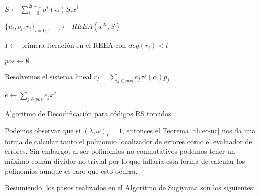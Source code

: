\begin{algorithm}
    \SetAlgoNoLine


    \BlankLine
    
    $S \gets \sum_{i=0}^{2t-1} \sigma^i(\alpha)S_ix^i$
    
    $\{ u_i,v_i,r_i \}_{i=0,1,\cdots,l} \gets REEA(x^{2t},S)$
    
    $ I \gets$ primera iteración en el REEA con $deg(r_i) < t$

    $ pos \gets \emptyset$




    Resolvemos el sistema lineal $r_I = \sum_{j \in pos} e_j\sigma^j(\alpha)p_j$

    $ e \gets  \sum_{j \in pos} e_jx^j $


    \caption{Algoritmo de Decodificación para códigos RS torcidos}
    \label{alg:uno}
\end{algorithm}


Podemos observar que si $(\lambda,\omega)_r = 1$, entonces el Teorema \ref{th:ec-nc} nos da una forma de calcular tanto el polinomio localizador de errores como el evaluador de errores. Sin embargo, al ser polinomios no conmutativos podemos tener un máximo común dividor no trivial por lo que fallaría esta forma de calcular los polinomios  aunque es raro que esto ocurra. 

Resumiendo, los pasos realizados en el Algoritmo de Sugiyama son los siguientes:

